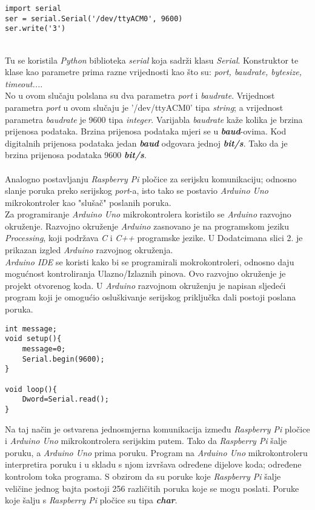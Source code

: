 \begin{lstlisting}[caption={Program za slanje poruka serijskim putem (\textit{Raspberry Pi})}, xleftmargin=.65in, label=program]
import serial
ser = serial.Serial('/dev/ttyACM0', 9600)
ser.write('3')
\end{lstlisting}
\\
Tu se koristila \textit{Python} biblioteka \textit{serial} koja sadrži klasu \textit{Serial}. Konstruktor te klase kao parametre prima razne vrijednosti kao što su: \textit{port, baudrate, bytesize, timeout...}.\\
No u ovom slučaju polslana su dva parametra \textit{port} i \textit{baudrate}. Vrijednost parametra \textit{port} u ovom slučaju je '/dev/ttyACM0' tipa \textit{string}; a vrijednost parametra \textit{baudrate} je 9600 tipa \textit{integer}.
Varijabla \textit{baudrate} kaže kolika je brzina prijenosa podataka. Brzina prijenosa podataka mjeri se u \textbf{\textit{baud}}-ovima. Kod digitalnih prijenosa podataka jedan \textbf{\textit{baud}} odgovara jednoj \textbf{\textit{bit/s}}.
Tako da je brzina prijenosa podataka 9600 \textbf{\textit{bit/s}}.\\
\\
Analogno postavljanju \textit{Raspberry Pi} pločice za serijsku komunikaciju; odnosno slanje poruka preko serijskog \textit{port}-a, isto tako se postavio \textit{Arduino Uno} mikrokontroler kao "slušač" poslanih poruka.\\
Za programiranje \textit{Arduino Uno} mikrokontrolera koristilo se \textit{Arduino} razvojno okruženje.
Razvojno okruženje \textit{Arduino} zasnovano je na programskom jeziku \textit{Processing}, koji podržava \textit{C} i \textit{C++} programske jezike. U Dodatcimana slici 2. je prikazan izgled \textit{Arduino} razvojnog okruženja. \\
\textit{Arduino IDE} se koristi kako bi se programirali mokrokontroleri, odnosno daju mogućnost kontroliranja Ulazno/Izlaznih pinova. Ovo razvojno okruženje je projekt otvorenog koda. 
\newpage
U \textit{Arduino} razvojnom okruženju je napisan sljedeći program koji je omogućio osluškivanje serijskog priključka dali postoji poslana poruka.

\begin{lstlisting}[caption={Program za primanje poruka serijskim putem (\textit{Arduino Uno})}, xleftmargin=.60in, label=program]
int message;
void setup(){
    message=0;
    Serial.begin(9600);
}

void loop(){
    Dword=Serial.read();
}
\end{lstlisting}

Na taj način je ostvarena jednosmjerna komunikacija između \textit{Raspberry Pi} pločice i \textit{Arduino Uno} mikrokontrolera serijskim putem. Tako da \textit{Raspberry Pi} šalje poruku, a \textit{Arduino Uno} prima poruku. Program na \textit{Arduino Uno} mikrokontroleru interpretira poruku i u skladu s njom izvršava određene dijelove koda; određene kontrolom toka programa. S obzirom da su poruke koje \textit{Raspberry Pi} šalje veličine jednog bajta postoji 256 različitih poruka koje se mogu poslati. Poruke koje šalju s \textit{Raspberry Pi} pločice su tipa \textbf{\textit{char}}.

